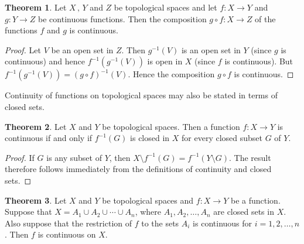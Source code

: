 \documentclass[11pt,a4paper]{article}
\theoremstyle{definition}
\newtheorem{thm}{Theorem}[subsection]
\begin{document}
\begin{thm}
Let $X\,,\,Y$ and $Z$ be topological spaces and let $f:X\rightarrow Y$ and $g:Y\rightarrow Z$ be continuous functions. Then the composition $g\circ f:X\rightarrow Z$ of the functions $f$ and $g$ is continuous.
\end{thm}


\begin{proof}
Let $V$ be an open set in $Z$. Then $g^{-1}(V)$ is an open set in $Y$ (since $g$ is continuous) and hence $f^{-1}(g^{-1}(V))$ is open in $X$ (since $f$ is continuous). But $f^{-1}(g^{-1}(V))=(g\circ f)^{-1}(V)$. Hence the composition $g\circ f$ is continuous.
\end{proof}

Continuity of functions on topological spaces may also be stated in terms of closed sets.

\begin{thm}
Let $X$ and $Y$ be topological spaces. Then a function $f:X\rightarrow Y$ is continuous if and only if $f^{-1}(G)$ is closed in $X$ for every closed subset $G$ of $Y$.
\end{thm}


\begin{proof}
If $G$ is any subset of $Y$, then $X\setminus f^{-1}(G)=f^{-1}(Y\setminus G)$. The result therefore follows immediately from the definitions of continuity and closed sets.
\end{proof}



\begin{thm}
Let $X$ and $Y$ be topological spaces and $f:X\rightarrow Y$ be a function. Suppose that $X=A_1\cup A_2\cup\cdots\cup A_n$, where $A_1,A_2,\ldots,A_n$ are closed sets in $X$. Also suppose that the restriction of $f$ to the sets $A_i$ is continuous for $i=1,2,\ldots,n$. Then $f$ is continuous on $X$.
\end{thm}
\end{document}
